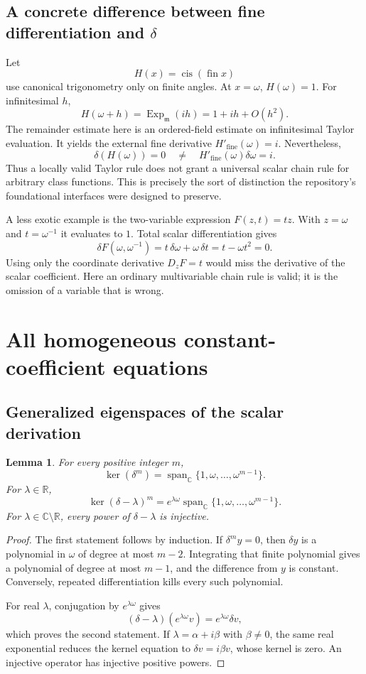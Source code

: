 \documentclass[11pt,letterpaper]{article}
\numberwithin{equation}{section}
\newtheorem{lemma}[theorem]{Lemma}
\theoremstyle{definition}
\theoremstyle{remark}
\newcommand{\R}{\mathbb R}
\newcommand{\C}{\mathbb C}
\newcommand{\mm}{\mathfrak m}
\newcommand{\fin}{\operatorname{fin}}
\newcommand{\cis}{\operatorname{cis}}
\newcommand{\Ex}{\operatorname{Exp}_{\mm}}
\newcommand{\Span}{\operatorname{span}}
\begin{document}
\subsection{A concrete difference between fine differentiation and \texorpdfstring{$\delta$}{the scalar derivation}}
Let
\[
 H(x)=\cis(\fin x)
\]
use canonical trigonometry only on finite angles. At $x=\omega$, $H(\omega)=1$. For infinitesimal $h$,
\[
 H(\omega+h)=\Ex(ih)=1+ih+O(h^2).
\]
The remainder estimate here is an ordered-field estimate on infinitesimal Taylor evaluation. It yields the external fine derivative $H'_{\mathrm{fine}}(\omega)=i$. Nevertheless,
\begin{equation}\label{eq:chainfail}
 \delta(H(\omega))=0
 \quad\ne\quad
 H'_{\mathrm{fine}}(\omega)\delta\omega=i.
\end{equation}
Thus a locally valid Taylor rule does not grant a universal scalar chain rule for arbitrary class functions. This is precisely the sort of distinction the repository's foundational interfaces were designed to preserve.

A less exotic example is the two-variable expression $F(z,t)=tz$. With $z=\omega$ and $t=\omega^{-1}$ it evaluates to $1$. Total scalar differentiation gives
\[
 \delta F(\omega,\omega^{-1})
 =t\,\delta\omega+\omega\,\delta t
 =t-\omega t^2=0.
\]
Using only the coordinate derivative $D_zF=t$ would miss the derivative of the scalar coefficient. Here an ordinary multivariable chain rule is valid; it is the omission of a variable that is wrong.

\section{All homogeneous constant-coefficient equations}\label{sec:constant}

\subsection{Generalized eigenspaces of the scalar derivation}
\begin{lemma}\label{lem:kerpower}
For every positive integer $m$,
\[
 \ker(\delta^m)=\Span_{\C}\{1,\omega,\ldots,\omega^{m-1}\}.
\]
For $\lambda\in\R$,
\[
 \ker(\delta-\lambda)^m
 =e^{\lambda\omega}\Span_{\C}\{1,\omega,\ldots,\omega^{m-1}\}.
\]
For $\lambda\in\C\setminus\R$, every power of $\delta-\lambda$ is injective.
\end{lemma}
\begin{proof}
The first statement follows by induction. If $\delta^m y=0$, then $\delta y$ is a polynomial in $\omega$ of degree at most $m-2$. Integrating that finite polynomial gives a polynomial of degree at most $m-1$, and the difference from $y$ is constant. Conversely, repeated differentiation kills every such polynomial.

For real $\lambda$, conjugation by $e^{\lambda\omega}$ gives
\[
 (\delta-\lambda)(e^{\lambda\omega}v)=e^{\lambda\omega}\delta v,
\]
which proves the second statement. If $\lambda=\alpha+i\beta$ with $\beta\ne0$, the same real exponential reduces the kernel equation to $\delta v=i\beta v$, whose kernel is zero. An injective operator has injective positive powers.
\end{proof}
\end{document}

